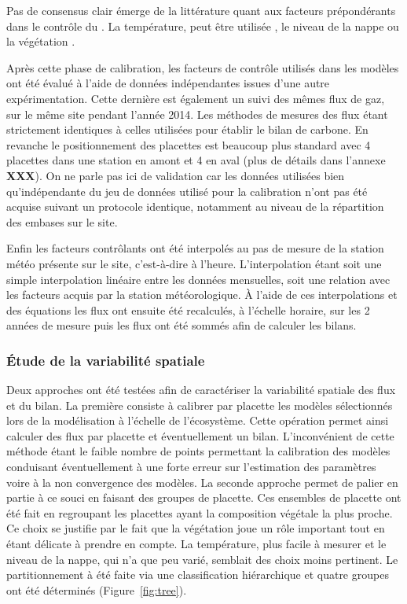 Pas de consensus clair émerge de la littérature quant aux facteurs prépondérants dans le contrôle du \chh.
La température, peut être utilisée \citep{alm1999,bubier1995}, le niveau de la nappe \citep{bubier1993} ou la végétation \citep{bortoluzzi2006}.

Après cette phase de calibration, les facteurs de contrôle utilisés dans les modèles ont été évalué à l'aide de données indépendantes issues d'une autre expérimentation.
Cette dernière est également un suivi des mêmes flux de gaz, sur le même site pendant l'année 2014.
Les méthodes de mesures des flux étant strictement identiques à celles utilisées pour établir le bilan de carbone.
En revanche le positionnement des placettes est beaucoup plus standard avec 4 placettes dans une station en amont et 4 en aval (plus de détails dans l'annexe \textbf{XXX}).
On ne parle pas ici de validation car les données utilisées bien qu'indépendante du jeu de données utilisé pour la calibration n'ont pas été acquise suivant un protocole identique, notamment au niveau de la répartition des embases sur le site.

Enfin les facteurs contrôlants ont été interpolés au pas de mesure de la station météo présente sur le site, c'est-à-dire à l'heure.
L'interpolation étant soit une simple interpolation linéaire entre les données mensuelles, soit une relation avec les facteurs acquis par la station météorologique.
À l'aide de ces interpolations et des équations les flux ont ensuite été recalculés, à l'échelle horaire, sur les 2 années de mesure puis les flux ont été sommés afin de calculer les bilans.

\subsubsection{Étude de la variabilité spatiale}

Deux approches ont été testées afin de caractériser la variabilité spatiale des flux et du bilan.
La première consiste à calibrer par placette les modèles sélectionnés lors de la modélisation à l'échelle de l'écosystème.
Cette opération permet ainsi calculer des flux par placette et éventuellement un bilan.
L'inconvénient de cette méthode étant le faible nombre de points permettant la calibration des modèles conduisant éventuellement à une forte erreur sur l'estimation des paramètres voire à la non convergence des modèles.
La seconde approche permet de palier en partie à ce souci en faisant des groupes de placette.
Ces ensembles de placette ont été fait en regroupant les placettes ayant la composition végétale la plus proche.
Ce choix se justifie par le fait que la végétation joue un rôle important tout en étant délicate à prendre en compte.
La température, plus facile à mesurer et le niveau de la nappe, qui n'a que peu varié, semblait des choix moins pertinent. 
Le partitionnement à été faite via une classification hiérarchique et quatre groupes ont été déterminés (Figure~\ref{fig:tree}).

